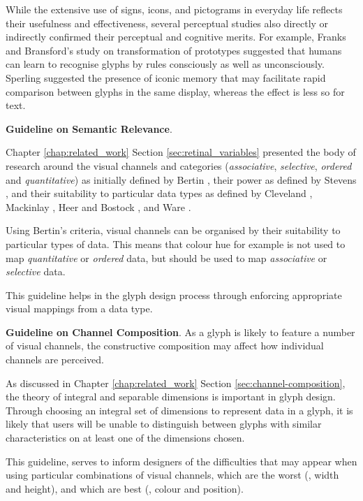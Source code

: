 While the extensive use of signs, icons, and pictograms in everyday life reflects their usefulness and effectiveness, several perceptual studies also directly or indirectly confirmed their perceptual and cognitive merits.
For example, Franks and Bransford's study on transformation of prototypes \cite{franks71} suggested that humans can learn to recognise glyphs by rules consciously as well as unconsciously.
Sperling \cite{sperling60} suggested the presence of iconic memory that may facilitate rapid comparison between glyphs in the same display, whereas the effect is less so for text.

\textbf{Guideline on Semantic Relevance}.

Chapter \ref{chap:related_work} Section \ref{sec:retinal_variables} presented the body of research around the visual channels and categories (\emph{associative}, \emph{selective}, \emph{ordered} and \emph{quantitative}) as initially defined by Bertin \cite{Bertin:1983:book}, their power as defined by Stevens \cite{stevens1975}, and their suitability to particular data types as defined by Cleveland \cite{cleveland1984graphical}, Mackinlay \cite{mackinlay1986automating}, Heer and Bostock \cite{heer2010crowdsourcing}, and Ware \cite{ware2010visual}.

Using Bertin's criteria, visual channels can be organised by their suitability to particular types of data.
This means that colour hue for example is not used to map \emph{quantitative} or \emph{ordered} data, but should be used to map \emph{associative} or \emph{selective} data.  

This guideline helps in the glyph design process through enforcing appropriate visual mappings from a data type.

\textbf{Guideline on Channel Composition}.
As a glyph is likely to feature a number of visual channels, the constructive composition may affect how individual channels are perceived.

As discussed in Chapter \ref{chap:related_work} Section \ref{sec:channel-composition}, the theory of integral and separable dimensions is important in glyph design.
Through choosing an integral set of dimensions to represent data in a glyph, it is likely that users will be unable to distinguish between glyphs with similar characteristics on at least one of the dimensions chosen. 

This guideline, serves to inform designers of the difficulties that may appear when using particular combinations of visual channels, which are the worst (\eg, width and height), and which are best (\eg, colour and position).

